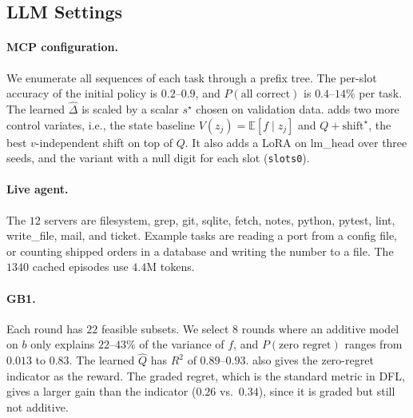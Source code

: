 \documentclass[10pt]{article}
\providecommand{\E}{\mathbb{E}}
\theoremstyle{plain}
\theoremstyle{definition}
\theoremstyle{remark}
\theoremstyle{definition}
\newcommand{\ctx}[1]{z_{#1}}                 %
\begin{document}
\subsection{LLM Settings}
\paragraph{MCP configuration.} We enumerate all sequences of each task through a prefix tree. The per-slot accuracy of the initial policy is $0.2$--$0.9$, and $P(\text{all correct})$ is $0.4$--$14\%$ per task. The learned $\hat\Delta$ is scaled by a scalar $s^\star$ chosen on validation data.  adds two more control variates, i.e., the state baseline $V(\ctx{j})=\E[f\mid\ctx{j}]$ and $Q{+}\mathrm{shift}^{\star}$, the best $v$-independent shift on top of $Q$. It also adds a LoRA on lm\_head over three seeds, and the variant with a null digit for each slot (\texttt{slots0}).

\paragraph{Live agent.} The $12$ servers are filesystem, grep, git, sqlite, fetch, notes, python, pytest, lint, write\_file, mail, and ticket. Example tasks are reading a port from a config file, or counting shipped orders in a database and writing the number to a file. The $1340$ cached episodes use $4.4$M tokens.

\paragraph{GB1.} Each round has $22$ feasible subsets. We select $8$ rounds where an additive model on $b$ only explains $22$--$43\%$ of the variance of $f$, and $P(\text{zero regret})$ ranges from $0.013$ to $0.83$. The learned $\hat Q$ has $R^2$ of $0.89$--$0.93$.  also gives the zero-regret indicator as the reward. The graded regret, which is the standard metric in DFL, gives a larger gain than the indicator ($0.26$ vs.\ $0.34$), since it is graded but still not additive.
\end{document}
